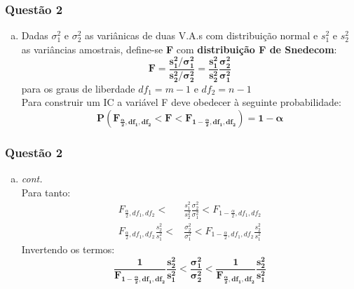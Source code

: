\documentclass{beamer}\usepackage[]{graphicx}\usepackage[]{color}
\begin{document}
    	\begin{frame}
    		\frametitle{Questão 2}
    		\begin{enumerate}[b)]
    			\item Dadas $\sigma_{1}^{2}$ e $\sigma_{2}^{2}$ as variânicas de duas V.A.s com distribuição normal e $s_{1}^2$ e $s_{2}^{2}$ as variâncias amostrais, define-se \textbf{F} com \textbf{distribuição F de Snedecom}:
    		$$\boldsymbol{F = \frac{s^{2}_{1}/\sigma_{1}^{2}}{s^{2}_{2}/\sigma_{2}^{2}} = \frac{s^{2}_{1}}{s^{2}_{2}} \frac{\sigma_{2}^{2}}{\sigma_{1}^{2}}}$$ 
    			para os graus de liberdade $df_{1} = m-1$ e $df_{2} = n-1$\\
    			Para construir um IC a variável F deve obedecer à seguinte probabilidade:
    			$$\boldsymbol{P(F_{\frac{\alpha}{2},df_{1},df_{2}} < F < F_{1-\frac{\alpha}{2},df_{1},df_{2}}) = 1 - \alpha}$$
    		\end{enumerate}	
    	\end{frame}
    
    	\begin{frame}
	    	\frametitle{Questão 2}
	    	\begin{enumerate}[b)]
	    		\item \textit{cont.}\\
	    			Para tanto:
	    			\begin{align*}
		    			F_{\frac{\alpha}{2},df_{1},df_{2}} < &\frac{s^{2}_{1}}{s^{2}_{2}} \frac{\sigma_{2}^{2}}{\sigma_{1}^{2}} < F_{1-\frac{\alpha}{2},df_{1},df_{2}}\\   
		    			F_{\frac{\alpha}{2},df_{1},df_{2}} \frac{s^{2}_{2}}{s^{2}_{1}}< & \frac{\sigma_{2}^{2}}{\sigma_{1}^{2}} < F_{1-\frac{\alpha}{2},df_{1},df_{2}}\frac{s^{2}_{2}}{s^{2}_{1}}
	    			\end{align*}
	    			Invertendo os termos:$$\boldsymbol{\frac{1}{F_{1-\frac{\alpha}{2},df_{1},df_{2}}}\frac{s^{2}_{2}}{s^{2}_{1}} < \frac{\sigma_{1}^{2}}{\sigma_{2}^{2}} < \frac{1}{F_{\frac{\alpha}{2},df_{1},df_{2}}}\frac{s^{2}_{2}}{s^{2}_{1}}}$$
	    	\end{enumerate}	
    \end{frame}
	
\end{document}
